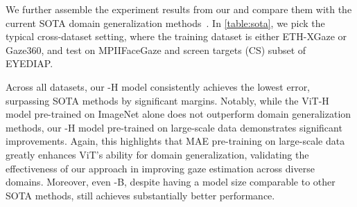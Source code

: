 \begin{table}[t]
    \centering
    \caption{
        Results of leave-one-dataset-out evaluation. 
        By taking the five gaze estimation datasets, we train the model on four datasets and test on the remaining one respectively. We show the results of each test dataset in the column. 
        Except for baselines, we evaluate three versions of \methodname with backbones of ViT-Base (\methodname-B), ViT-Large (\methodname-L), and ViT-Huge (\methodname-H).
    }
    \label{table:leave_out}
\end{table}



We further assemble the experiment results from our \methodname and compare them with the current SOTA domain generalization methods~\cite{cheng2022puregaze,xu2023learning,zhao2024improving,bao2024feature,yin2024clip}.
In \cref{table:sota}, we pick the typical cross-dataset setting, where the training dataset is either ETH-XGaze or Gaze360, and test on MPIIFaceGaze and screen targets (CS) subset of EYEDIAP.



Across all datasets, our \methodname-H model consistently achieves the lowest error, surpassing SOTA methods by significant margins.
Notably, while the ViT-H model pre-trained on ImageNet alone does not outperform domain generalization methods, our \methodname-H model pre-trained on large-scale data demonstrates significant improvements.
Again, this highlights that MAE pre-training on large-scale data greatly enhances ViT's ability for domain generalization, validating the effectiveness of our approach in improving gaze estimation across diverse domains.
Moreover, even \methodname-B, despite having a model size comparable to other SOTA methods, still achieves substantially better performance.



